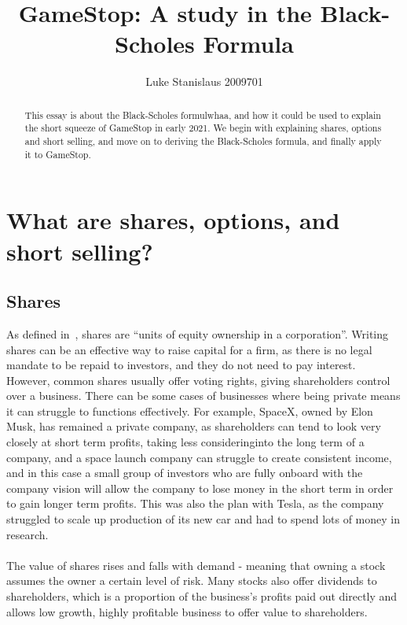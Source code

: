 \documentclass[11pt]{article} %
\title{GameStop: A study in the Black-Scholes Formula}
\author{Luke Stanislaus 2009701}
\begin{document}
\maketitle
\tableofcontents
\begin{abstract}
    This essay is about the Black-Scholes formulwhaa, and how it could be 
    used to explain the short squeeze of GameStop in early 2021. We begin 
    with explaining shares, options and short selling, and move on to 
    deriving the Black-Scholes formula, and finally apply it to GameStop.
    \end{abstract}



\section{What are shares, options, and short selling?}
\subsection{Shares}
As defined in~\cite{shares}, shares are ``units of equity 
ownership in a corporation''. Writing shares can be an effective way to raise 
capital for a firm, as there is no legal mandate to be repaid to 
investors, and they do not need to pay interest. However, common shares usually offer voting 
rights, giving shareholders control over a business. There can be some cases 
of businesses where being private means it can struggle to functions effectively.
For example, SpaceX, owned by Elon Musk, has remained a private company, as 
shareholders can tend to look very closely at short term profits, taking less 
consideringinto the long term of a company, and a space launch company can 
struggle to create consistent income, and in this case a small group of investors 
who are fully onboard with the company vision will allow the company to lose 
money in the short term in order to gain longer term profits. This was also 
the plan with Tesla, as the company struggled to scale up production of its new 
car and had to spend lots of money in research. 
\paragraph{}
The value of 
shares rises and falls with demand - meaning that owning a stock assumes 
the owner a certain level of risk. Many stocks also offer dividends to 
shareholders, which is a proportion of the business's profits paid out 
directly and allows low growth, highly profitable business to offer value 
to shareholders.
\end{document}
